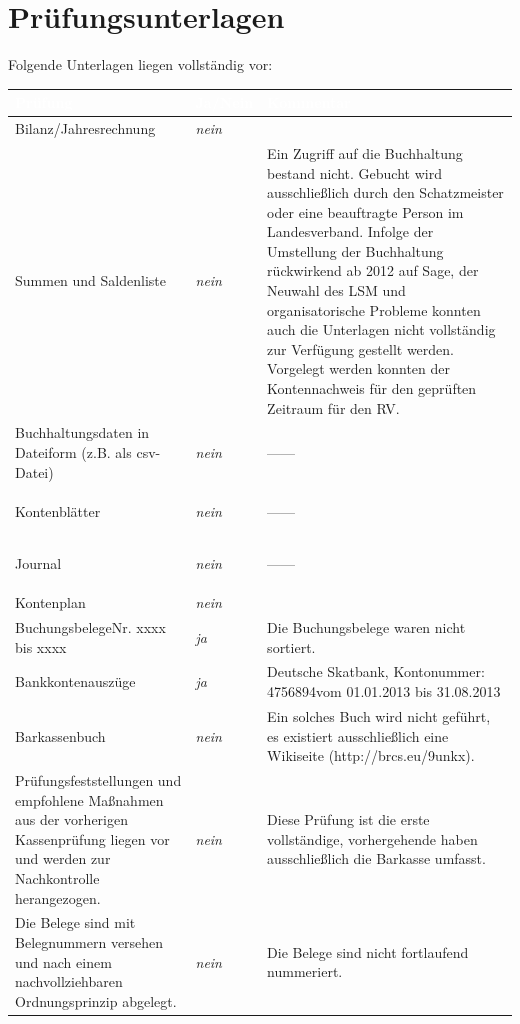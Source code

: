 \documentclass[%
	titlepage,oneside,12pt,headlines=1.5,numbers=noenddot, chapterprefix=false,parskip=full-,DIV=14,pagesize,headings=small]{scrreprt}
\newcommand*{\ditto}{\begin{center}\vspace{-24pt}---\quad \grqq\quad ---\vspace{-12pt}\end{center}}
\begin{document}
\chapter{Prüfungsunterlagen}
Folgende Unterlagen liegen vollständig vor:
\renewcommand{\arraystretch}{1.2}%
\setlength{\arrayrulewidth}{1.5pt}%
%
\begin{longtable}[ht]{|p{} p{} p{}|}
\hline\rowcolor{pirateorange} 
	\textcolor{white}{\textbf{Prüfung}} & \textcolor{white}{\textbf{Ja/Nein}} & \textcolor{white}{\textbf{Kommentar}}\\\endhead
        \footnotesize Bilanz/Jahresrechnung & \footnotesize \textit{nein} & \footnotesize  \\ 
        \footnotesize Summen und Saldenliste & \footnotesize \textit{nein} & \scriptsize Ein Zugriff auf die Buchhaltung bestand nicht. Gebucht wird ausschließlich durch den Schatzmeister oder eine beauftragte Person im Landesverband. Infolge der Umstellung der Buchhaltung rückwirkend ab 2012 auf Sage, der Neuwahl des LSM und organisatorische Probleme konnten auch die Unterlagen nicht vollständig zur Verfügung gestellt werden. Vorgelegt werden konnten der Kontennachweis für den geprüften Zeitraum für den RV. \\
        \footnotesize Buchhaltungsdaten in Dateiform (z.B. als csv-Datei) & \footnotesize \textit{nein} & \ditto  \\
        \footnotesize Kontenblätter & \footnotesize \textit{nein} &  \ditto \\
        \footnotesize Journal & \footnotesize \textit{nein} & \ditto \\
        \footnotesize Kontenplan & \footnotesize \textit{nein} & \footnotesize  \\
        \footnotesize Buchungsbelege\newline Nr. xxxx bis xxxx & \footnotesize \textit{ja} & \footnotesize Die Buchungsbelege waren nicht sortiert. \\
        \footnotesize Bankkontenauszüge & \footnotesize \textit{ja} & \footnotesize Deutsche Skatbank, Kontonummer: 4756894\newline vom 01.01.2013 bis 31.08.2013 \\
        \footnotesize Barkassenbuch & \footnotesize \textit{nein} & \footnotesize Ein solches Buch wird nicht geführt, es existiert ausschließlich eine Wikiseite (http://brcs.eu/9unkx). \\
        \footnotesize Prüfungsfeststellungen und empfohlene Maßnahmen aus der vorherigen Kassenprüfung liegen vor und werden zur Nachkontrolle herangezogen. & \footnotesize \textit{nein} & \footnotesize Diese Prüfung ist die erste vollständige, vorhergehende haben ausschließlich die Barkasse umfasst.\\
        \footnotesize Die Belege sind mit Belegnummern versehen und nach einem nachvollziehbaren Ordnungsprinzip abgelegt. & \footnotesize \textit{nein} & \footnotesize Die Belege sind nicht fortlaufend nummeriert. \\
\hline
\end{longtable}
\end{document}
